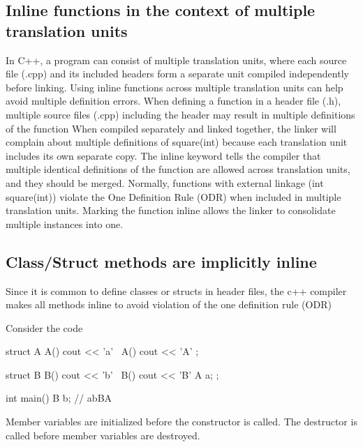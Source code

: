 \documentclass{report}
\begin{document}
    \subsection{Inline functions in the context of multiple translation units}
    \bigbreak \noindent 
    In C++, a program can consist of multiple translation units, where each source file (.cpp) and its included headers form a separate unit compiled independently before linking. Using inline functions across multiple translation units can help avoid multiple definition errors.
    \bigbreak \noindent 
    When defining a function in a header file (.h), multiple source files (.cpp) including the header may result in multiple definitions of the function
    \bigbreak \noindent 
    When compiled separately and linked together, the linker will complain about multiple definitions of square(int) because each translation unit includes its own separate copy.
    \bigbreak \noindent 
    The inline keyword tells the compiler that multiple identical definitions of the function are allowed across translation units, and they should be merged.
    \bigbreak \noindent 
    Normally, functions with external linkage (int square(int)) violate the One Definition Rule (ODR) when included in multiple translation units.
    \bigbreak \noindent 
    Marking the function inline allows the linker to consolidate multiple instances into one.
    \bigbreak \noindent 

    \bigbreak \noindent 
    \subsection{Class/Struct methods are implicitly inline}
    \bigbreak \noindent 
    Since it is common to define classes or structs in header files, the c++ compiler makes all methods inline to avoid violation of the one definition rule (ODR)

    \pagebreak 
    \bigbreak \noindent 
    Consider the code
    \bigbreak \noindent 
    \begin{cppcode}
        struct A{
            A() { cout << 'a'}
            ~A() { cout << 'A'}
        };

        struct B {
            B() {cout << 'b'}
            ~B() {cout << 'B'}
            A a;
        };

        int main() {B b;} // abBA
    \end{cppcode}
    \bigbreak \noindent 
    Member variables are initialized before the constructor is called. The destructor is called before member variables are destroyed.
\end{document}
